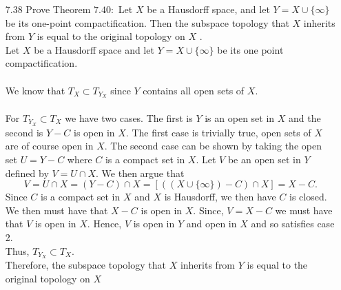 \documentclass[12pt]{article}
\begin{document}
\begin{enumerate}
		\item[7.38] Prove Theorem $7.40 :$ Let $X$ be a Hausdorff space, and let $Y = X \cup \{ \infty \}$ be its one-point compactification. Then the subspace topology that $X$ inherits from $Y$ is equal to the original topology on $X$ .\\
		Let $ X $ be a Hausdorff space and let $ Y=X\cup\{\infty\} $ be its one point compactification. \\
		\\
		We know that $ T_X \subset T_{Y_X} $ since $ Y $ contains all open sets of $ X $. \\
		\\
		For $ T_{Y_X} \subset T_X $ we have two cases. The first is $ Y $ is an open set in $ X $ and the second is $ Y-C $ is open in $ X $. The first case is trivially true, open sets of $ X $ are of course open in $ X $. The second case can be shown by taking the open set $ U = Y-C $ where $ C $ is a compact set in $ X $. Let $ V $ be an open set in $ Y $ defined by $ V = U\cap X $. We then argue that 
			\[V= U\cap X = (Y-C)\cap X = [((X\cup\{\infty\})-C)\cap X]= X-C.\]
		 Since $ C $ is a compact set in $ X $ and $ X $ is Hausdorff, we then have $ C $ is closed. We then must have that $ X-C $ is open in $ X $. Since, $ V = X-C $ we must have that $ V $ is open in $ X $. Hence, $ V $ is open in $ Y $ and open in $ X $ and so satisfies case 2. \\
		 Thus, $ T_{Y_X} \subset T_X $.\\
		 Therefore,  the subspace topology that $X$ inherits from $Y$ is equal to the original topology on $X$
		

\end{enumerate}
\end{document}
